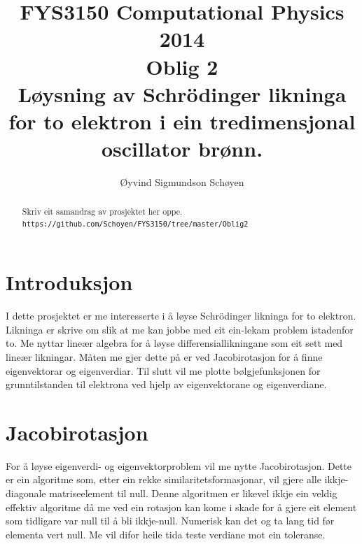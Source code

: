 \documentclass[11pt, a4paper]{article}
\begin{document}
\begin{titlepage}

  \title{\normalsize FYS3150 Computational Physics 2014\\
  \vspace{10mm}
  \huge Oblig 2\\
  \vspace{10mm}
  \normalsize {\bf Løysning av Schrödinger likninga for to elektron i ein tredimensjonal oscillator brønn.}}

  \author{Øyvind Sigmundson Schøyen}

\end{titlepage}

\maketitle

\newpage
\begin{abstract}
  Skriv eit samandrag av prosjektet her oppe. \\
  \texttt{https://github.com/Schoyen/FYS3150/tree/master/Oblig2}
\end{abstract}

\newpage
  \tableofcontents
\newpage

\section{Introduksjon}
  I dette prosjektet er me interesserte i å løyse Schrödinger likninga for to elektron. Likninga er skrive om slik at me kan jobbe med eit ein-lekam problem 
  istadenfor to. Me nyttar lineær algebra for å løyse differensiallikningane som eit sett med lineær likningar. Måten me gjer dette på er ved Jacobirotasjon 
  for å finne eigenvektorar og eigenverdiar. Til slutt vil me plotte bølgjefunksjonen for grunntilstanden til elektrona ved hjelp av eigenvektorane og 
  eigenverdiane.


\section{Jacobirotasjon}
  For å løyse eigenverdi- og eigenvektorproblem vil me nytte Jacobirotasjon. Dette er ein algoritme som, etter ein rekke similaritetsformasjonar, vil 
  gjere alle ikkje-diagonale matriseelement til null. Denne algoritmen er likevel ikkje ein veldig effektiv algoritme då me ved ein rotasjon kan kome 
  i skade for å gjere eit element som tidligare var null til å bli ikkje-null. Numerisk kan det og ta lang tid før elementa vert null. Me vil difor heile 
  tida teste verdiane mot ein toleranse.
\end{document}
